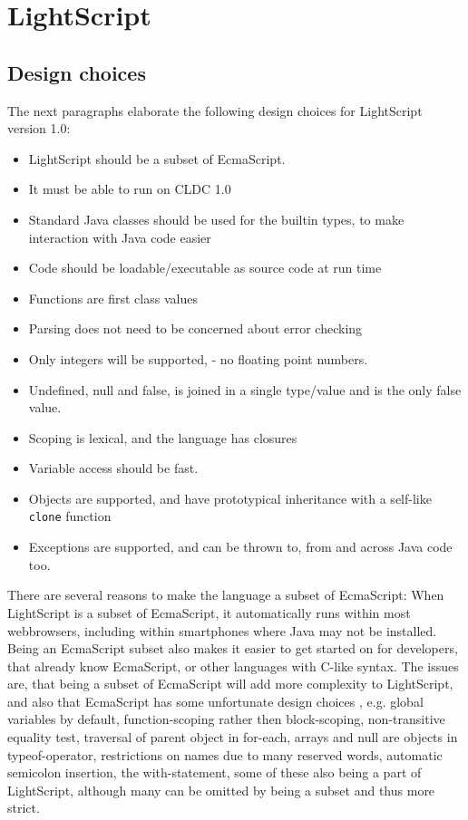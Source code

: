 \documentclass[11pt]{report}
\begin{document}
\chapter{LightScript}
\label{lightscript}
\section{Design choices}
\label{lightscript-design}
The next paragraphs elaborate the following design choices for LightScript version 1.0:
\begin{itemize}
\item LightScript should be a subset of EcmaScript.
\item It must be able to run on CLDC 1.0
\item Standard Java classes should be used for the builtin types, to make interaction with Java code easier
\item Code should be loadable/executable as source code at run time
\item Functions are first class values
\item Parsing does not need to be concerned about error checking
\item Only integers will be supported, - no floating point numbers.
\item Undefined, null and false, is joined in a single type/value and is the only false value.
\item Scoping is lexical, and the language has closures
\item Variable access should be fast.
\item Objects are supported, and have prototypical inheritance with a self-like \verb|clone| function
\item Exceptions are supported, and can be thrown to, from and across Java code too.
\end{itemize}

There are several reasons to make the language a subset of EcmaScript:
When LightScript is a subset of EcmaScript, it automatically runs within most webbrowsers, including within smartphones where Java may not be installed.
Being an EcmaScript subset also makes it easier to get started on for developers, that already know EcmaScript, or other languages with C-like syntax.
The issues are, that being a subset of EcmaScript will add more complexity to LightScript, and also that EcmaScript has some unfortunate design choices \cite{crockford-web}, e.g. global variables by default, function-scoping rather then block-scoping, non-transitive equality test, traversal of parent object in for-each, arrays and null are objects in typeof-operator, restrictions on names due to many reserved words, automatic semicolon insertion, the with-statement, 
some of these also being a part of LightScript,
although many can be omitted by being a subset and thus more strict. 
\end{document}
